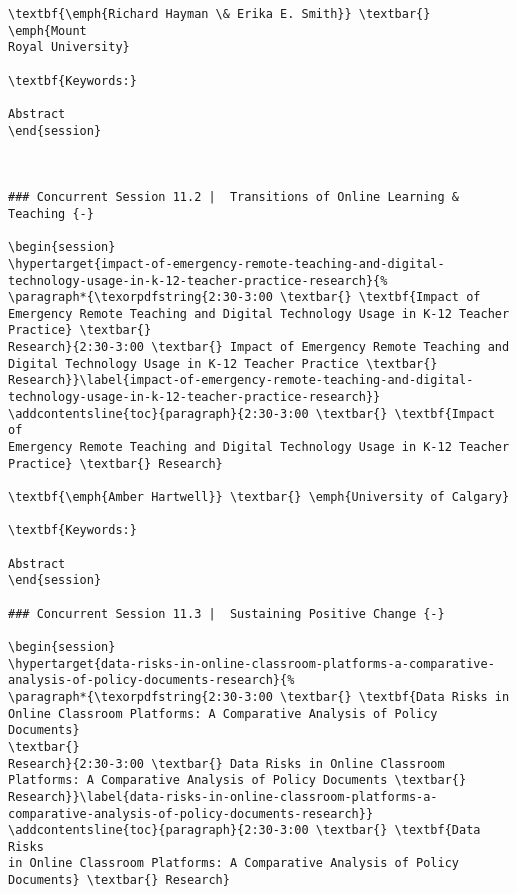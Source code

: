 \documentclass[
]{book}
\begin{document}
\begin{verbatim}
\textbf{\emph{Richard Hayman \& Erika E. Smith}} \textbar{} \emph{Mount
Royal University}

\textbf{Keywords:}

Abstract
\end{session}



### Concurrent Session 11.2 |  Transitions of Online Learning & Teaching {-}

\begin{session}
\hypertarget{impact-of-emergency-remote-teaching-and-digital-technology-usage-in-k-12-teacher-practice-research}{%
\paragraph*{\texorpdfstring{2:30-3:00 \textbar{} \textbf{Impact of
Emergency Remote Teaching and Digital Technology Usage in K-12 Teacher
Practice} \textbar{}
Research}{2:30-3:00 \textbar{} Impact of Emergency Remote Teaching and Digital Technology Usage in K-12 Teacher Practice \textbar{} Research}}\label{impact-of-emergency-remote-teaching-and-digital-technology-usage-in-k-12-teacher-practice-research}}
\addcontentsline{toc}{paragraph}{2:30-3:00 \textbar{} \textbf{Impact of
Emergency Remote Teaching and Digital Technology Usage in K-12 Teacher
Practice} \textbar{} Research}

\textbf{\emph{Amber Hartwell}} \textbar{} \emph{University of Calgary}

\textbf{Keywords:}

Abstract
\end{session}

### Concurrent Session 11.3 |  Sustaining Positive Change {-}

\begin{session}
\hypertarget{data-risks-in-online-classroom-platforms-a-comparative-analysis-of-policy-documents-research}{%
\paragraph*{\texorpdfstring{2:30-3:00 \textbar{} \textbf{Data Risks in
Online Classroom Platforms: A Comparative Analysis of Policy Documents}
\textbar{}
Research}{2:30-3:00 \textbar{} Data Risks in Online Classroom Platforms: A Comparative Analysis of Policy Documents \textbar{} Research}}\label{data-risks-in-online-classroom-platforms-a-comparative-analysis-of-policy-documents-research}}
\addcontentsline{toc}{paragraph}{2:30-3:00 \textbar{} \textbf{Data Risks
in Online Classroom Platforms: A Comparative Analysis of Policy
Documents} \textbar{} Research}


\end{verbatim}
\end{document}
